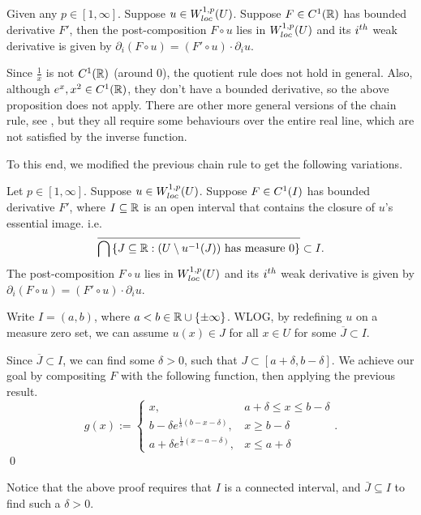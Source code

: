 \documentclass{ifacconf}
\begin{document}
\begin{prop}
\cite[Proposition 4.1.21]{weber_introduction_2018}
    Given any $p \in [1,\infty]$. Suppose $u \in {W^{1,p}_{loc}{\left ( U \right )}}$. Suppose $F \in {C^{1}_{}{\left ( {\mathbb{R}}\right )}}$ has bounded derivative $F'$, then the post-composition $F \circ u$ lies in ${W^{1,p}_{loc}{\left ( U \right )}}$ and its $i^{th}$ weak derivative is given by $\partial_i(F \circ u) = (F' \circ u) \cdot \partial_iu$.
\end{prop}
\begin{rem}
    Since $\frac{1}{x}$ is not ${C^{1}_{}{\left ( {\mathbb{R}} \right )}}$ (around 0), the quotient rule does not hold in general. Also, although $e^x, x^2 \in {C^{1}_{}{\left ( {\mathbb{R}}\right )}}$, they don't have a bounded derivative, so the above proposition does not apply. There are other more general versions of the chain rule, see \cite{leoni_necessary_2007}, but they all require some behaviours over the entire real line, which are not satisfied by the inverse function.
\end{rem}
To this end, we modified the previous chain rule to get the following variations.
\begin{prop}
\cite[Proposition 2.5.7]{yixing_multiplicative_2025}
    Let $p \in [1,\infty]$. Suppose $u \in {W^{1,p}_{loc}{\left ( U \right )}}$. Suppose $F \in {C^{1}_{}{\left ( I \right )}}$ has bounded derivative $F'$, where $I \subseteq {\mathbb{R}}$ is an open interval that contains the closure of $u$'s essential image. i.e. $$\overline{\bigcap\left\{ J \subseteq {\mathbb{R}}: (U \setminus u^{-1}(J)) \text{ has measure } 0 \right\}} \subset I.$$ The post-composition $F \circ u$ lies in ${W^{1,p}_{loc}{\left ( U \right )}}$ and its $i^{th}$ weak derivative is given by $\partial_i(F \circ u) = (F' \circ u) \cdot \partial_iu$.
\begin{pf}
    Write $I = (a,b)$, where $a < b \in {\mathbb{R}} \cup \left\{ \pm \infty \right\}$.
    WLOG, by redefining $u$ on a measure zero set, we can assume $u(x) \in J$ for all $x \in U$ for some $\overline{J} \subset I$.
    
    Since $\overline{J} \subset I$, we can find some $\delta > 0$, such that $J \subset [a+\delta, b-\delta]$. We achieve our goal by compositing $F$ with the following function, then applying the previous result.
    $$g(x) := 
    \begin{cases}
        x, & a + \delta \leq x \leq b - \delta\\
        b - \delta e^{\frac{1}{\delta}(b-x-\delta)}, & x \geq b - \delta\\
        a + \delta e^{\frac{1}{\delta}(x-a-\delta)}, & x \leq a + \delta
    \end{cases}.$$
    \qed
\end{pf}
\end{prop}
\begin{rem}
    Notice that the above proof requires that $I$ is a connected interval, and $\bar{J} \subseteq I$ to find such a $\delta > 0$.
\end{rem}
\end{document}

